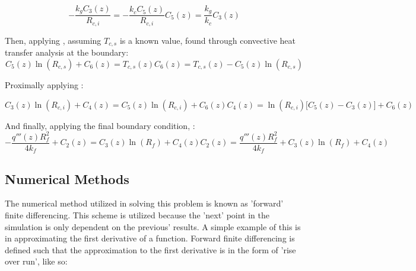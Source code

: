 \documentclass{article}
\begin{document}
\begin{subequations}
    \begin{equation}
        -\frac{k_gC_3(z)}{R_{c,i}} = -\frac{k_cC_5(z)}{R_{c,i}}
    \end{equation}
    \begin{equation}
        C_5(z) = \frac{k_g}{k_c}C_3(z)
    \end{equation}
\end{subequations}

Then, applying , assuming $T_{c,s}$ is a known value, found through convective heat transfer analysis at the boundary:
\begin{subequations}
    \begin{equation}
        C_5(z)\ln(R_{c,s}) + C_6(z) = T_{c,s}(z)
    \end{equation}
    \begin{equation}
        C_6(z) = T_{c,s}(z) - C_5(z)\ln(R_{c,s})
    \end{equation}
\end{subequations}

Proximally applying :

\begin{subequations}
    \begin{equation}
        C_3(z)\ln(R_{c,i}) + C_4(z) =  C_5(z)\ln(R_{c,i}) + C_6(z)
    \end{equation}
    \begin{equation}
        C_4(z) = \ln(R_{c,i})\bigr[C_5(z) - C_3(z)\bigr] + C_6(z)
    \end{equation}
\end{subequations}

And finally, applying the final boundary condition, :
\begin{subequations}
    \begin{equation}
        -\frac{q'''(z)R_{f}^2}{4k_f} + C_2(z) = C_3(z)\ln(R_f) + C_4(z)
    \end{equation}
    \begin{equation}
         C_2(z) = \frac{q'''(z)R_{f}^2}{4k_f} + C_3(z)\ln(R_f) + C_4(z)
    \end{equation}
\end{subequations}

\subsection{Numerical Methods}\label{nummet}
The numerical method utilized in solving this problem is known as 'forward' finite differencing. This scheme is utilized because the 'next' point in the simulation is only dependent on the previous' results. A simple example of this is in approximating the first derivative of a function. Forward finite differencing is defined such that the approximation to the first derivative is in the form of 'rise over run', like so:
\end{document}
